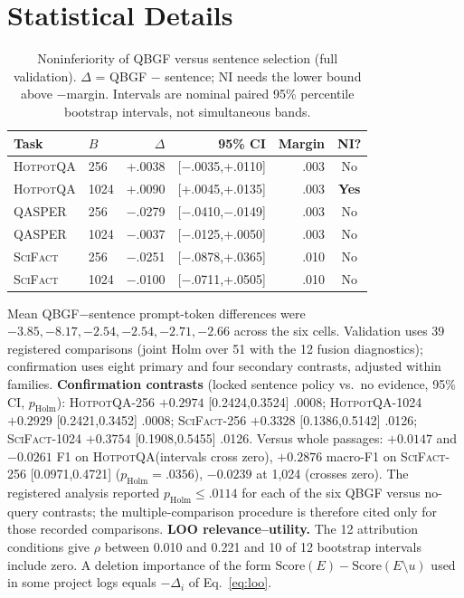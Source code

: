\documentclass[10pt,twocolumn,letterpaper]{article}
\newcommand{\hotpot}{\textsc{HotpotQA}\xspace}
\newcommand{\qasper}{\textsc{QASPER}\xspace}
\newcommand{\scifact}{\textsc{SciFact}\xspace}
\begin{document}
\section{Statistical Details}\label{app:stats}
\begin{table}[H]\centering\small\setlength{\tabcolsep}{5pt}
\caption{Noninferiority of QBGF versus sentence selection (full validation). $\Delta$ = QBGF $-$ sentence; NI needs the lower bound above $-$margin. Intervals are nominal paired 95\% percentile bootstrap intervals, not simultaneous bands.}\label{tab:ni}
\begin{tabular}{llrrrc}\toprule
Task & $B$ & $\Delta$ & 95\% CI & Margin & NI?\\\midrule
\hotpot & 256 & +.0038 & [$-$.0035,+.0110] & .003 & No\\
\hotpot & 1024 & +.0090 & [+.0045,+.0135] & .003 & \textbf{Yes}\\
\qasper & 256 & $-$.0279 & [$-$.0410,$-$.0149] & .003 & No\\
\qasper & 1024 & $-$.0037 & [$-$.0125,+.0050] & .003 & No\\
\scifact & 256 & $-$.0251 & [$-$.0878,+.0365] & .010 & No\\
\scifact & 1024 & $-$.0100 & [$-$.0711,+.0505] & .010 & No\\\bottomrule
\end{tabular}\end{table}
Mean QBGF$-$sentence prompt-token differences were $-3.85,-8.17,-2.54,-2.54,-2.71,-2.66$ across the six cells. Validation uses 39 registered comparisons (joint Holm over 51 with the 12 fusion diagnostics); confirmation uses eight primary and four secondary contrasts, adjusted within families. \textbf{Confirmation contrasts} (locked sentence policy vs.\ no evidence, 95\% CI, $p_{\mathrm{Holm}}$): \hotpot-256 $+0.2974$ [0.2424,0.3524] .0008; \hotpot-1024 $+0.2929$ [0.2421,0.3452] .0008; \scifact-256 $+0.3328$ [0.1386,0.5142] .0126; \scifact-1024 $+0.3754$ [0.1908,0.5455] .0126. Versus whole passages: $+0.0147$ and $-0.0261$ F1 on \hotpot (intervals cross zero), $+0.2876$ macro-F1 on \scifact-256 [0.0971,0.4721] ($p_{\mathrm{Holm}}{=}.0356$), $-0.0239$ at 1,024 (crosses zero). The registered analysis reported $p_{\mathrm{Holm}}\le.0114$ for each of the six QBGF versus no-query contrasts; the multiple-comparison procedure is therefore cited only for those recorded comparisons. \textbf{LOO relevance--utility.} The 12 attribution conditions give $\rho$ between 0.010 and 0.221 and 10 of 12 bootstrap intervals include zero. A deletion importance of the form $\mathrm{Score}(E)-\mathrm{Score}(E\setminus u)$ used in some project logs equals $-\Delta_i$ of Eq.~\ref{eq:loo}.
\end{document}
